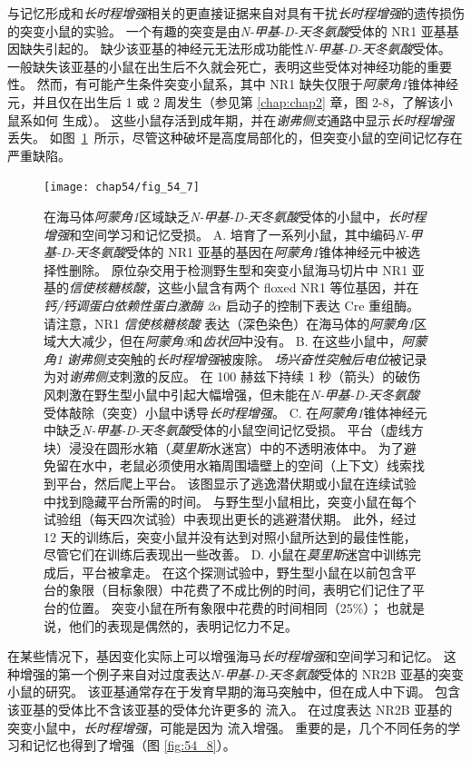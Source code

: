 与记忆形成和\textit{长时程增强}相关的更直接证据来自对具有干扰\textit{长时程增强}的遗传损伤的突变小鼠的实验。
一个有趣的突变是由\textit{N-甲基-D-天冬氨酸}受体的 NR1 亚基基因缺失引起的。
缺少该亚基的神经元无法形成功能性\textit{N-甲基-D-天冬氨酸}受体。
一般缺失该亚基的小鼠在出生后不久就会死亡，表明这些受体对神经功能的重要性。
然而，有可能产生条件突变小鼠系，其中 NR1 缺失仅限于\textit{阿蒙角1}锥体神经元，并且仅在出生后 1 或 2 周发生（参见第 \ref{chap:chap2} 章，图 2-8，了解该小鼠系如何 生成）。
这些小鼠存活到成年期，并在\textit{谢弗侧支}通路中显示\textit{长时程增强}丢失。
如图~\ref{fig:54_7}~所示，尽管这种破坏是高度局部化的，但突变小鼠的空间记忆存在严重缺陷。


\begin{figure}[htbp]
	\centering
	\texttt{[image: chap54/fig\_54\_7]}
	\caption{在海马体\textit{阿蒙角1}区域缺乏\textit{N-甲基-D-天冬氨酸}受体的小鼠中，\textit{长时程增强}和空间学习和记忆受损。
		A. 培育了一系列小鼠，其中编码\textit{N-甲基-D-天冬氨酸}受体的 NR1 亚基的基因在\textit{阿蒙角1}锥体神经元中被选择性删除。
		原位杂交用于检测野生型和突变小鼠海马切片中 NR1 亚基的\textit{信使核糖核酸}，这些小鼠含有两个 floxed NR1 等位基因，并在 \textit{钙/钙调蛋白依赖性蛋白激酶 2}$\alpha$ 启动子的控制下表达 Cre 重组酶。
		请注意，NR1 \textit{信使核糖核酸} 表达（深色染色）在海马体的\textit{阿蒙角1}区域大大减少，但在\textit{阿蒙角3}和\textit{齿状回}中没有。
		B. 在这些小鼠中，\textit{阿蒙角1} \textit{谢弗侧支}突触的\textit{长时程增强}被废除。
		\textit{场兴奋性突触后电位}被记录为对\textit{谢弗侧支}刺激的反应。
		在 100 赫兹下持续 1 秒（箭头）的破伤风刺激在野生型小鼠中引起大幅增强，但未能在\textit{N-甲基-D-天冬氨酸}受体敲除（突变）小鼠中诱导\textit{长时程增强}。
		C. 在\textit{阿蒙角1}锥体神经元中缺乏\textit{N-甲基-D-天冬氨酸}受体的小鼠空间记忆受损。
		平台（虚线方块）浸没在圆形水箱（\textit{莫里斯}水迷宫）中的不透明液体中。 为了避免留在水中，老鼠必须使用水箱周围墙壁上的空间（上下文）线索找到平台，然后爬上平台。
		该图显示了逃逸潜伏期或小鼠在连续试验中找到隐藏平台所需的时间。
		与野生型小鼠相比，突变小鼠在每个试验组（每天四次试验）中表现出更长的逃避潜伏期。
		此外，经过 12 天的训练后，突变小鼠并没有达到对照小鼠所达到的最佳性能，尽管它们在训练后表现出一些改善。
		D. 小鼠在\textit{莫里斯}迷宫中训练完成后，平台被拿走。
		在这个探测试验中，野生型小鼠在以前包含平台的象限（目标象限）中花费了不成比例的时间，表明它们记住了平台的位置。
		突变小鼠在所有象限中花费的时间相同（25\%）；
		也就是说，他们的表现是偶然的，表明记忆力不足。}
	\label{fig:54_7}
\end{figure}


在某些情况下，基因变化实际上可以增强海马\textit{长时程增强}和空间学习和记忆。
这种增强的第一个例子来自对过度表达\textit{N-甲基-D-天冬氨酸}受体的 NR2B 亚基的突变小鼠的研究。
该亚基通常存在于发育早期的海马突触中，但在成人中下调。
包含该亚基的受体比不含该亚基的受体允许更多的  流入。
在过度表达 NR2B 亚基的突变小鼠中，\textit{长时程增强}，可能是因为  流入增强。
重要的是，几个不同任务的学习和记忆也得到了增强（图 \ref{fig:54_8}）。


